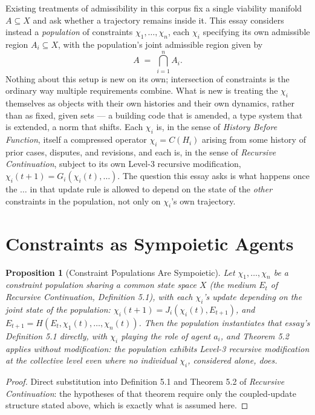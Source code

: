 \documentclass[11pt]{article}
\newtheorem{proposition}[definition]{Proposition}
\begin{document}
Existing treatments of admissibility in this corpus fix a single viability manifold $A\subseteq X$ and ask whether a trajectory remains inside it. This essay considers instead a \emph{population} of constraints $\chi_1,\dots,\chi_n$, each $\chi_i$ specifying its own admissible region $A_i\subseteq X$, with the population's joint admissible region given by
\[
A \;=\; \bigcap_{i=1}^n A_i.
\]
Nothing about this setup is new on its own; intersection of constraints is the ordinary way multiple requirements combine. What is new is treating the $\chi_i$ themselves as objects with their own histories and their own dynamics, rather than as fixed, given sets — a building code that is amended, a type system that is extended, a norm that shifts. Each $\chi_i$ is, in the sense of \emph{History Before Function}, itself a compressed operator $\chi_i = C(H_i)$ arising from some history of prior cases, disputes, and revisions, and each is, in the sense of \emph{Recursive Continuation}, subject to its own Level-3 recursive modification, $\chi_i(t+1) = G_i(\chi_i(t), \dots)$. The question this essay asks is what happens once the $\dots$ in that update rule is allowed to depend on the state of the \emph{other} constraints in the population, not only on $\chi_i$'s own trajectory.

\section{Constraints as Sympoietic Agents}

\begin{proposition}[Constraint Populations Are Sympoietic]
\label{prop:sympoietic}
Let $\chi_1,\dots,\chi_n$ be a constraint population sharing a common state space $X$ (the medium $E_t$ of \emph{Recursive Continuation}, Definition 5.1), with each $\chi_i$'s update depending on the joint state of the population: $\chi_i(t+1) = J_i(\chi_i(t), E_{t+1})$, and $E_{t+1} = H(E_t, \chi_1(t),\dots,\chi_n(t))$. Then the population instantiates that essay's Definition 5.1 directly, with $\chi_i$ playing the role of agent $a_i$, and Theorem 5.2 applies without modification: the population exhibits Level-3 recursive modification at the collective level even where no individual $\chi_i$, considered alone, does.
\end{proposition}

\begin{proof}
Direct substitution into Definition 5.1 and Theorem 5.2 of \emph{Recursive Continuation}: the hypotheses of that theorem require only the coupled-update structure stated above, which is exactly what is assumed here.
\end{proof}
\end{document}
